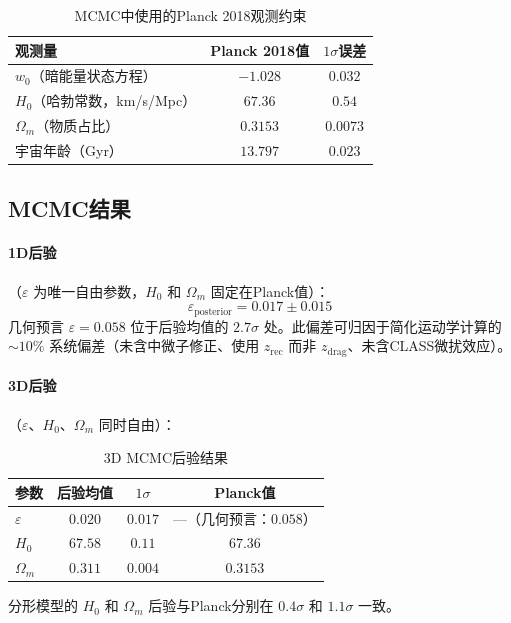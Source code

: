 \documentclass[12pt,a4paper,twocolumn]{article}
\begin{document}
\begin{table}[H]
\centering
\caption{MCMC中使用的Planck 2018观测约束}
\label{tab:planck_obs_cn}
\begin{tabular}{l|c|c}
\hline
观测量 & Planck 2018值 & $1\sigma$误差 \\
\hline
$w_0$（暗能量状态方程） & $-1.028$ & $0.032$ \\
$H_0$（哈勃常数，km/s/Mpc） & $67.36$ & $0.54$ \\
$\Omega_m$（物质占比） & $0.3153$ & $0.0073$ \\
宇宙年龄（Gyr） & $13.797$ & $0.023$ \\
\hline
\end{tabular}
\end{table}

\subsection{MCMC结果}

\paragraph{1D后验}（$\varepsilon$ 为唯一自由参数，$H_0$ 和 $\Omega_m$ 固定在Planck值）：
\[
\varepsilon_{\mathrm{posterior}} = 0.017 \pm 0.015
\]
几何预言 $\varepsilon = 0.058$ 位于后验均值的 $2.7\sigma$ 处。此偏差可归因于简化运动学计算的 $\sim 10\%$ 系统偏差（未含中微子修正、使用 $z_{\mathrm{rec}}$ 而非 $z_{\mathrm{drag}}$、未含CLASS微扰效应）。

\paragraph{3D后验}（$\varepsilon$、$H_0$、$\Omega_m$ 同时自由）：

\begin{table}[H]
\centering
\caption{3D MCMC后验结果}
\label{tab:mcmc_3d_cn}
\begin{tabular}{l|c|c|c}
\hline
参数 & 后验均值 & $1\sigma$ & Planck值 \\
\hline
$\varepsilon$ & $0.020$ & $0.017$ & ---（几何预言：$0.058$） \\
$H_0$ & $67.58$ & $0.11$ & $67.36$ \\
$\Omega_m$ & $0.311$ & $0.004$ & $0.3153$ \\
\hline
\end{tabular}
\end{table}

分形模型的 $H_0$ 和 $\Omega_m$ 后验与Planck分别在 $0.4\sigma$ 和 $1.1\sigma$ 一致。
\end{document}
